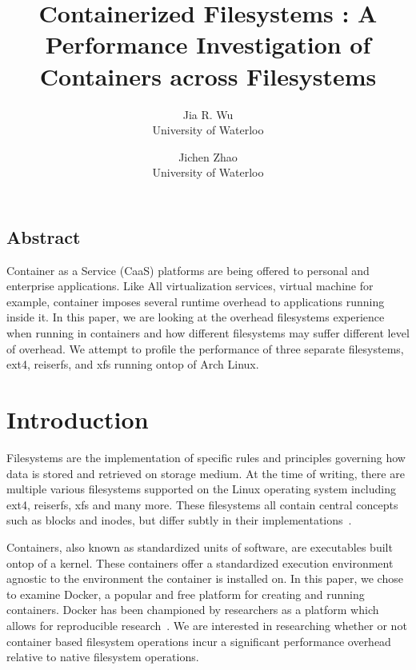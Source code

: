 \documentclass[letterpaper,twocolumn,10pt]{article}
\begin{document}
\date{}

\title{\Large \bf Containerized Filesystems : A Performance Investigation of Containers across Filesystems}

\author{
{\rm Jia R. Wu}\\
University of Waterloo
\and
{\rm Jichen Zhao}\\
University of Waterloo
} %

\maketitle

\thispagestyle{empty}


\subsection*{Abstract}

Container as a Service (CaaS) platforms are being offered to personal and enterprise applications.
Like All virtualization services, virtual machine for example, container imposes several runtime overhead to applications running inside it.
In this paper, we are looking at the overhead filesystems experience when running in containers and how different filesystems may suffer 
different level of overhead.
We attempt to profile the performance of three separate filesystems, ext4, reiserfs, and xfs running ontop of Arch Linux.



\section{Introduction}
Filesystems are the implementation of specific rules and principles governing how data is stored and retrieved on storage medium. At the time of writing, there are multiple various filesystems supported on the Linux operating system including ext4, reiserfs, xfs and many more. These filesystems all contain central concepts such as blocks and inodes, but differ subtly in their implementations~\cite{TLDP}.

Containers, also known as standardized units of software, are executables built ontop of a kernel. These containers offer a standardized execution environment agnostic to the environment the container is installed on. In this paper, we chose to examine Docker, a popular and free platform for creating and running containers. Docker has been championed by researchers as a platform which allows for reproducible research~\cite{boettiger2015introduction}. We are interested in researching whether or not container based filesystem operations incur a significant performance overhead relative to native filesystem operations.
\end{document}

